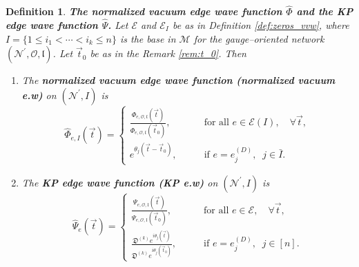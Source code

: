 \documentclass[11pt]{amsart}
\theoremstyle{plain}
\numberwithin{equation}{section}
\newtheorem{definition}{Definition}[subsection]
\begin{document}
\begin{definition}\label{def:norm_vac_gen}\textbf{The normalized vacuum edge wave function $\hat \Phi$ and the KP edge wave function $\hat \Psi$.}
Let $\mathcal E$ and $\mathcal E_I$ be as in Definition \ref{def:zeros_vvw}, where $I=\{1\le i_1 <\cdots < i_k \le n\}$ is the base in ${\mathcal M}$ for the gauge--oriented network $({\mathcal N}^{\prime}, \mathcal O, \mathfrak l)$.
Let $\vec t_0$ be as in the Remark \ref{rem:t_0}. 
Then 
\begin{enumerate}
\item The \textbf{normalized vacuum edge wave function (normalized vacuum e.w)} on $({\mathcal N}^{\prime}, I)$ is 
\begin{equation}\label{eq:vvfnorN}
\hat \Phi_{e, I} (\vec t) = \left\{ \begin{array}{ll} \displaystyle \frac{\Phi_{e, \mathcal O,\mathfrak l} (\vec t) }{\Phi_{e, \mathcal O,\mathfrak l} (\vec t_0) }, &\quad\quad \mbox{for all } e\in {\mathcal E}(I), \quad \forall \vec t,\\
e^{\theta_{j} (\vec t -\vec t_0)}, &\quad\quad \mbox{if } e=e^{(D)}_j, \;\; j\in \bar I.
\end{array}\right.
\end{equation}
\item The \textbf{KP edge wave function (KP e.w)} on $({\mathcal N}^{\prime}, I)$ is 
\begin{equation}\label{eq:KPvfnorN}
\hat \Psi_{e} (\vec t) = \left\{ \begin{array}{ll} \displaystyle\frac{\Psi_{e, \mathcal O,\mathfrak l} (\vec t) }{\Psi_{e, \mathcal O,\mathfrak l} (\vec t_0) }, &\quad\quad \mbox{for all } e\in \mathcal E, \quad \forall \vec t,\\
\displaystyle\frac{{\mathfrak D}^{(k)} e^{i\theta_{j} (\vec t)}}{{\mathfrak D}^{(k)} e^{i\theta_{j} (\vec t_0)}},&\quad\quad \mbox{if } e=e^{(D)}_j, \;\; j\in [n].
\end{array}\right.
\end{equation}
\end{enumerate}
\end{definition}
\end{document}
